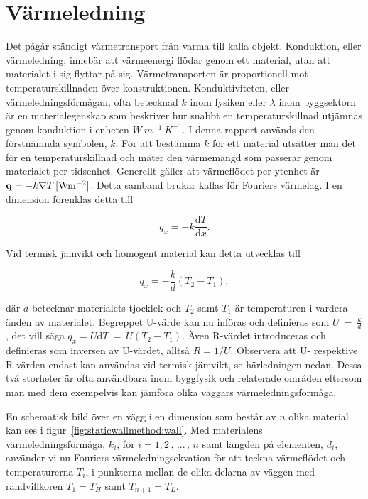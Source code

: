 \section{Värmeledning}
\label{sec:heatconduction}

Det pågår ständigt värmetransport från varma till kalla objekt. Konduktion, eller värmeledning, innebär att värmeenergi flödar genom ett material, utan att materialet i sig flyttar på sig. Värmetransporten är proportionell mot temperaturskillnaden över konstruktionen. Konduktiviteten, eller värmeledningsförmågan, ofta betecknad $k$ inom fysiken eller $\lambda$ inom byggsektorn är en materialegenskap som beskriver hur snabbt en temperaturskillnad utjämnas genom konduktion i enheten $\unit{W~m^{-1}~K^{-1}}$. I denna rapport används den förstnämnda symbolen, $k$. För att bestämma $k$ för ett material utsätter man det för en temperaturskillnad och mäter den värmemängd som passerar genom materialet per tidsenhet. Generellt gäller att värmeflödet per ytenhet är $\mathbf{q} = - \unit[k \nabla T]{[Wm^{-2}]}$. Detta samband brukar kallas för Fouriers värmelag. I en dimension förenklas detta till

\begin{equation}\label{eq:conduction:fourier}\boxed{ \; \; \;
q_x = -k \frac{\mathrm{d}T}{\mathrm{d}x}.
\; \; \; }
\end{equation}

Vid termisk jämvikt och homogent material kan detta utvecklas till

\begin{equation}
q_x = -\frac{k}{d}\left( T_2-T_1\right),
\end{equation}

där $d$ betecknar materialets tjocklek och $T_2$ samt $T_1$ är temperaturen i vardera änden av materialet. Begreppet U-värde kan nu införas och definieras som $U~=~\frac{k}{d}$, det vill säga $q_x = U\mathrm{d}T~=~U\left( T_2-T_1 \right)$. Även R-värdet introduceras och definieras som inversen av U-värdet, alltså $R=1/U$. Observera att U- respektive R-värden endast kan användas vid termisk jämvikt, se härledningen nedan. Dessa två storheter är ofta användbara inom byggfysik och relaterade områden eftersom man med dem exempelvis kan jämföra olika väggars värmeledningsförmåga.

En schematisk bild över en vägg i en dimension som består av $n$ olika material kan ses i figur~\ref{fig:staticwallmethod:wall}. Med materialens värmeledningsförmåga, $k_i$, för $i=1,2\,,\,...\,,\,n$ samt längden på elementen, $d_i$, använder vi nu Fouriers värmeledningsekvation för att teckna värmeflödet och temperaturerna $T_i$, i punkterna mellan de olika delarna av väggen med randvillkoren $T_1 = T_H$ samt $T_{n+1} = T_L$.

